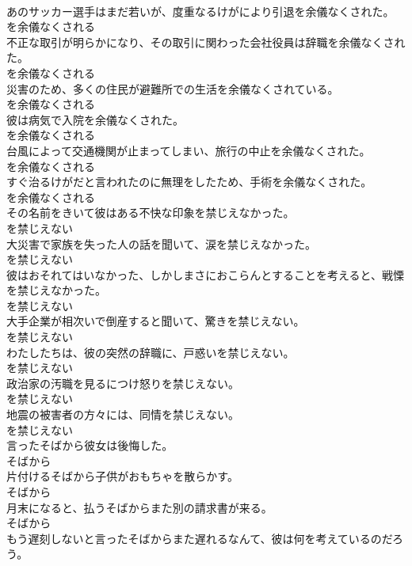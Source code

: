 \documentclass[8pt]{extreport}
\begin{document}
\begin{CJK}{UTF8}{min}
\\	あのサッカー選手はまだ若いが、度重なるけがにより引退を余儀なくされた。	
\\	を余儀なくされる
\\	不正な取引が明らかになり、その取引に関わった会社役員は辞職を余儀なくされた。	
\\	を余儀なくされる
\\	災害のため、多くの住民が避難所での生活を余儀なくされている。	
\\	を余儀なくされる
\\	彼は病気で入院を余儀なくされた。	
\\	を余儀なくされる
\\	台風によって交通機関が止まってしまい、旅行の中止を余儀なくされた。	
\\	を余儀なくされる
\\	すぐ治るけがだと言われたのに無理をしたため、手術を余儀なくされた。	
\\	を余儀なくされる
\\	その名前をきいて彼はある不快な印象を禁じえなかった。	
\\	を禁じえない
\\	大災害で家族を失った人の話を聞いて、涙を禁じえなかった。	
\\	を禁じえない
\\	彼はおそれてはいなかった、しかしまさにおこらんとすることを考えると、戦慄を禁じえなかった。	
\\	を禁じえない
\\	大手企業が相次いで倒産すると聞いて、驚きを禁じえない。	
\\	を禁じえない
\\	わたしたちは、彼の突然の辞職に、戸惑いを禁じえない。	
\\	を禁じえない
\\	政治家の汚職を見るにつけ怒りを禁じえない。	
\\	を禁じえない
\\	地震の被害者の方々には、同情を禁じえない。	
\\	を禁じえない
\\	言ったそばから彼女は後悔した。	
\\	そばから
\\	片付けるそばから子供がおもちゃを散らかす。	
\\	そばから
\\	月末になると、払うそばからまた別の請求書が来る。	
\\	そばから
\\	もう遅刻しないと言ったそばからまた遅れるなんて、彼は何を考えているのだろう。	

\end{CJK}
\end{document}
